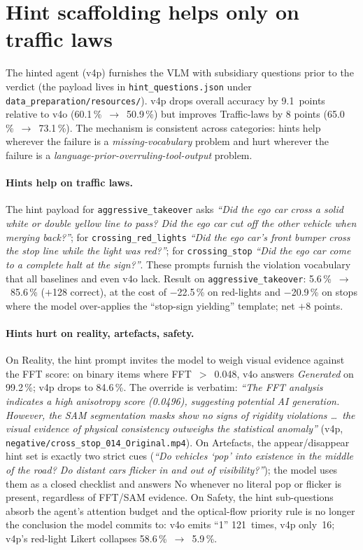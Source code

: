 \documentclass[11pt,a4paper]{article}
\newcommand{\pct}[1]{#1\,\%}
\newcommand{\code}[1]{\texttt{#1}}
\begin{document}
\section{Hint scaffolding helps only on traffic laws}
\label{sec:hints}

The hinted agent (v4p) furnishes the VLM with subsidiary questions
prior to the verdict (the payload lives in
\code{hint\_questions.json} under \code{data\_preparation/resources/}).
v4p drops overall accuracy by 9.1~points relative to v4o
(\pct{60.1}~$\to$~\pct{50.9}) but improves Traffic-laws by 8 points
(\pct{65.0}~$\to$~\pct{73.1}). The mechanism is consistent across
categories: hints help wherever the failure is a \emph{missing-vocabulary}
problem and hurt wherever the failure is a
\emph{language-prior-overruling-tool-output} problem.

\paragraph{Hints help on traffic laws.} The hint payload for
\code{aggressive\_takeover} asks
\emph{``Did the ego car cross a solid white or double yellow line to pass?
Did the ego car cut off the other vehicle when merging back?''}; for
\code{crossing\_red\_lights} \emph{``Did the ego car's front bumper cross
the stop line while the light was red?''}; for \code{crossing\_stop}
\emph{``Did the ego car come to a complete halt at the sign?''}. These
prompts furnish the violation vocabulary that all baselines and even v4o
lack. Result on \code{aggressive\_takeover}: \pct{5.6}~$\to$~\pct{85.6}
($+$128 correct), at the cost of $-$\pct{22.5} on red-lights and
$-$\pct{20.9} on stops where the model over-applies the
``stop-sign yielding'' template; net $+$8 points.

\paragraph{Hints hurt on reality, artefacts, safety.} On Reality, the hint
prompt invites the model to weigh visual evidence against the FFT score:
on binary items where FFT~$>$~0.048, v4o answers \emph{Generated} on
\pct{99.2}; v4p drops to \pct{84.6}. The override is verbatim: \emph{``The
FFT analysis indicates a high anisotropy score (0.0496), suggesting
potential AI generation. However, the SAM segmentation masks show no
signs of rigidity violations \dots\ the visual evidence of physical
consistency outweighs the statistical anomaly''} (v4p,
\code{negative/cross\_stop\_014\_Original.mp4}). On Artefacts, the
appear/disappear hint set is exactly two strict cues
(\emph{``Do vehicles `pop' into existence in the middle of the road?
Do distant cars flicker in and out of visibility?''}); the model uses
them as a closed checklist and answers No whenever no literal pop or
flicker is present, regardless of FFT/SAM evidence. On Safety, the hint
sub-questions absorb the agent's attention budget and the optical-flow
priority rule is no longer the conclusion the model commits to: v4o
emits ``1'' 121~times, v4p only~16; v4p's red-light Likert collapses
\pct{58.6}~$\to$~\pct{5.9}.
\end{document}
